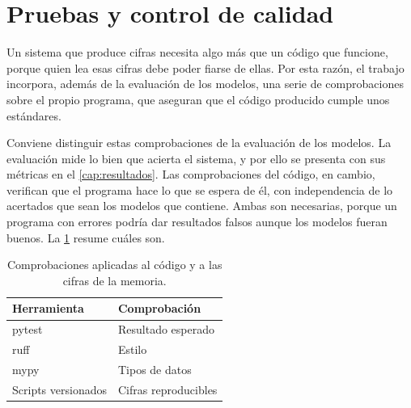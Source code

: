 \section{Pruebas y control de calidad}
\label{sec:pruebas}

Un sistema que produce cifras necesita algo más que un código que funcione, porque quien lea esas cifras debe poder fiarse de ellas.
Por esta razón, el trabajo incorpora, además de la evaluación de los modelos, una serie de comprobaciones sobre el propio programa, que aseguran que el código producido cumple unos estándares.

Conviene distinguir estas comprobaciones de la evaluación de los modelos.
La evaluación mide lo bien que acierta el sistema, y por ello se presenta con sus métricas en el \cref{cap:resultados}.
Las comprobaciones del código, en cambio, verifican que el programa hace lo que se espera de él, con independencia de lo acertados que sean los modelos que contiene.
Ambas son necesarias, porque un programa con errores podría dar resultados falsos aunque los modelos fueran buenos.
La \cref{tab:comprobaciones} resume cuáles son.

\begin{table}[htbp]
  \centering
  \caption{Comprobaciones aplicadas al código y a las cifras de la memoria.}
  \label{tab:comprobaciones}
  \small
  \begin{tabular}{ll}
    \toprule
    Herramienta & Comprobación \\
    \midrule
    pytest & Resultado esperado \\
    ruff & Estilo \\
    mypy & Tipos de datos \\
    Scripts versionados & Cifras reproducibles \\
    \bottomrule
  \end{tabular}
\end{table}
